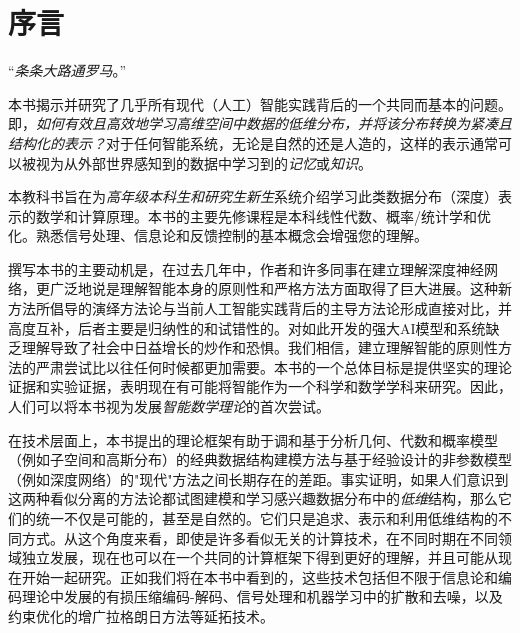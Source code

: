 \documentclass[../../book-main.tex]{subfiles}
\begin{document}
\chapter*{序言}

\begin{center}
``{\em 条条大路通罗马}。''

\end{center}
\vspace{5mm}

本书揭示并研究了几乎所有现代（人工）智能实践背后的一个共同而基本的问题。即，{\em 如何有效且高效地学习高维空间中数据的低维分布，并将该分布转换为紧凑且结构化的表示？}对于任何智能系统，无论是自然的还是人造的，这样的表示通常可以被视为从外部世界感知到的数据中学习到的{\em 记忆}或{\em 知识}。

本教科书旨在为{\em 高年级本科生和研究生新生}系统介绍学习此类数据分布（深度）表示的数学和计算原理。本书的主要先修课程是本科线性代数、概率/统计学和优化。熟悉信号处理、信息论和反馈控制的基本概念会增强您的理解。

撰写本书的主要动机是，在过去几年中，作者和许多同事在建立理解深度神经网络，更广泛地说是理解智能本身的原则性和严格方法方面取得了巨大进展。这种新方法所倡导的演绎方法论与当前人工智能实践背后的主导方法论形成直接对比，并高度互补，后者主要是归纳性的和试错性的。对如此开发的强大AI模型和系统缺乏理解导致了社会中日益增长的炒作和恐惧。我们相信，建立理解智能的原则性方法的严肃尝试比以往任何时候都更加需要。本书的一个总体目标是提供坚实的理论证据和实验证据，表明现在有可能将智能作为一个科学和数学学科来研究。因此，人们可以将本书视为发展{\em 智能数学理论}的首次尝试。

在技术层面上，本书提出的理论框架有助于调和基于分析几何、代数和概率模型（例如子空间和高斯分布）的经典数据结构建模方法与基于经验设计的非参数模型（例如深度网络）的"现代"方法之间长期存在的差距。事实证明，如果人们意识到这两种看似分离的方法论都试图建模和学习感兴趣数据分布中的{\em 低维}结构，那么它们的统一不仅是可能的，甚至是自然的。它们只是追求、表示和利用低维结构的不同方式。从这个角度来看，即使是许多看似无关的计算技术，在不同时期在不同领域独立发展，现在也可以在一个共同的计算框架下得到更好的理解，并且可能从现在开始一起研究。正如我们将在本书中看到的，这些技术包括但不限于信息论和编码理论中发展的有损压缩编码-解码、信号处理和机器学习中的扩散和去噪，以及约束优化的增广拉格朗日方法等延拓技术。
\end{document}

